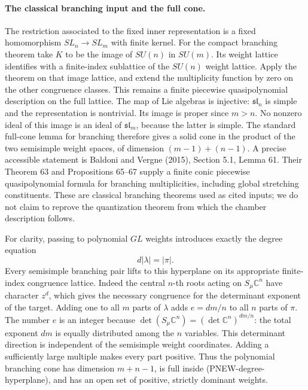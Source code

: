 \paragraph{The classical branching input and the full cone.}
The restriction associated to the fixed inner representation
is a fixed homomorphism $SL_n\to SL_m$ with finite kernel.
For the compact branching theorem take $K$ to be the image
of $SU(n)$ in $SU(m)$.  Its weight lattice identifies with
a finite-index sublattice of the $SU(n)$ weight lattice.
Apply the theorem on that image lattice, and extend the
multiplicity function by zero on the other congruence
classes.  This remains a finite piecewise quasipolynomial
description on the full lattice.
The map of Lie algebras is injective: $\mathfrak{sl}_n$ is
simple and the representation is nontrivial.  Its image is
proper since $m>n$.  No nonzero ideal of this image is an
ideal of $\mathfrak{sl}_m$, because the latter is simple.
The standard full-cone lemma for branching therefore gives
a solid cone in the product of the two semisimple weight
spaces, of dimension $(m-1)+(n-1)$.
A precise accessible statement is Baldoni and Vergne (2015),
Section 5.1, Lemma 61.
Their Theorem 63 and Propositions 65--67 supply a finite
conic piecewise quasipolynomial formula for branching
multiplicities, including global stretching constituents.
These are classical branching theorems used as cited inputs;
we do not claim to reprove the quantization theorem from
which the chamber description follows.

For clarity, passing to polynomial $GL$ weights introduces
exactly the degree equation
\[
                      d|\lambda|=|\pi|.
 \tag{PNEW-degree-hyperplane}
\]
Every semisimple branching pair lifts to this hyperplane on
its appropriate finite-index congruence lattice.  Indeed the
central $n$-th roots acting on $S_\mu\mathbb C^n$ have
character $z^d$, which gives the necessary congruence for
the determinant exponent of the target.  Adding one to all
$m$ parts of $\lambda$ adds $e=dm/n$ to all $n$ parts of
$\pi$.  The number $e$ is an integer because
$\det(S_\mu\mathbb C^n)=(\det\mathbb C^n)^{dm/n}$:
the total exponent $dm$ is equally distributed among the
$n$ variables.  This determinant direction is independent
of the semisimple weight coordinates.  Adding a sufficiently
large multiple makes every part positive.  Thus the
polynomial branching cone has dimension $m+n-1$, is full
inside (PNEW-degree-hyperplane), and has an open set of
positive, strictly dominant weights.


